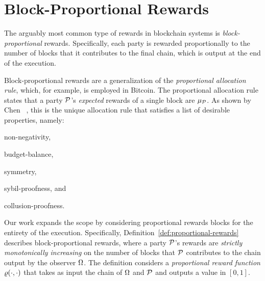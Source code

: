 \section{Block-Proportional Rewards}\label{sec:proportional}

The arguably most common type of rewards in blockchain systems is
\emph{block-proportional} rewards. Specifically, each party is rewarded
proportionally to the number of blocks that it contributes to the final chain,
which is output at the end of the execution.

Block-proportional rewards are a generalization of the \emph{proportional allocation
rule}, which, for example, is employed in Bitcoin. The proportional allocation rule
states that a party $\mathcal{P}$'s \emph{expected} rewards of a single block are $\mu_{\mathcal{P}}$.
As shown by Chen \etal~\cite{chen2019axiomatic}, this
is the unique allocation rule that satisfies a list of desirable properties,
namely:
\begin{inparaenum}[i)]
    \item non-negativity,
    \item budget-balance,
    \item symmetry,
    \item sybil-proofness, and
    \item collusion-proofness.
\end{inparaenum}

Our work expands the scope by considering proportional rewards \wrt blocks for
the entirety of the execution. Specifically,
Definition~\ref{def:proportional-rewards} describes block-proportional rewards, where
a party $\mathcal{P}$'s rewards are \emph{strictly monotonically increasing} on the number of blocks that $\mathcal{P}$
contributes to the chain output by the observer $\Omega$. The definition considers a \emph{proportional reward function} $\varrho(\cdot,\cdot)$ that takes as input the chain of $\Omega$ and $\mathcal{P}$ and outputs a value in $[0,1]$.


